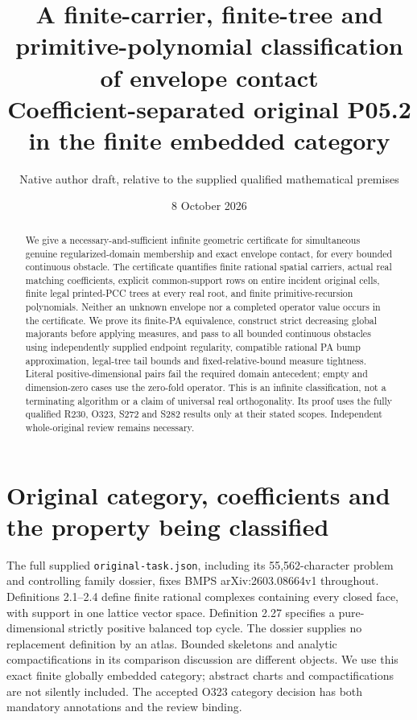 \documentclass[11pt]{article}
\title{A finite-carrier, finite-tree and primitive-polynomial classification of envelope contact\\
\large Coefficient-separated original P05.2 in the finite embedded category}
\author{Native author draft, relative to the supplied qualified mathematical premises}
\date{8 October 2026}
\begin{document}
\maketitle
\begin{abstract}
We give a necessary-and-sufficient infinite geometric certificate for simultaneous genuine regularized-domain membership and exact envelope contact, for every bounded continuous obstacle. The certificate quantifies finite rational spatial carriers, actual real matching coefficients, explicit common-support rows on entire incident original cells, finite legal printed-PCC trees at every real root, and finite primitive-recursion polynomials. Neither an unknown envelope nor a completed operator value occurs in the certificate. We prove its finite-PA equivalence, construct strict decreasing global majorants before applying measures, and pass to all bounded continuous obstacles using independently supplied endpoint regularity, compatible rational PA bump approximation, legal-tree tail bounds and fixed-relative-bound measure tightness. Literal positive-dimensional pairs fail the required domain antecedent; empty and dimension-zero cases use the zero-fold operator. This is an infinite classification, not a terminating algorithm or a claim of universal real orthogonality. Its proof uses the fully qualified R230, O323, S272 and S282 results only at their stated scopes. Independent whole-original review remains necessary.
\end{abstract}
\tableofcontents

\section{Original category, coefficients and the property being classified}
The full supplied \texttt{original-task.json}, including its 55,562-character problem and controlling family dossier, fixes BMPS arXiv:2603.08664v1 throughout. Definitions 2.1--2.4 define finite rational complexes containing every closed face, with support in one lattice vector space. Definition 2.27 specifies a pure-dimensional strictly positive balanced top cycle. The dossier supplies no replacement definition by an atlas. Bounded skeletons and analytic compactifications in its comparison discussion are different objects. We use this exact finite globally embedded category; abstract charts and compactifications are not silently included. The accepted O323 category decision has both mandatory annotations and the review binding.
\end{document}
